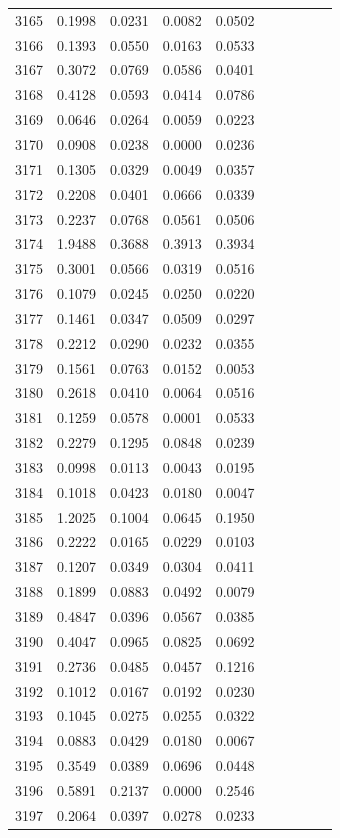 \begin{table}
\begin{tabular}{cccccccccc}
3165& 0.1998& 0.0231& 0.0082& 0.0502\\ 
3166& 0.1393& 0.0550& 0.0163& 0.0533\\ 
3167& 0.3072& 0.0769& 0.0586& 0.0401\\ 
3168& 0.4128& 0.0593& 0.0414& 0.0786\\ 
3169& 0.0646& 0.0264& 0.0059& 0.0223\\ 
3170& 0.0908& 0.0238& 0.0000& 0.0236\\ 
3171& 0.1305& 0.0329& 0.0049& 0.0357\\ 
3172& 0.2208& 0.0401& 0.0666& 0.0339\\ 
3173& 0.2237& 0.0768& 0.0561& 0.0506\\ 
3174& 1.9488& 0.3688& 0.3913& 0.3934\\ 
3175& 0.3001& 0.0566& 0.0319& 0.0516\\ 
3176& 0.1079& 0.0245& 0.0250& 0.0220\\ 
3177& 0.1461& 0.0347& 0.0509& 0.0297\\ 
3178& 0.2212& 0.0290& 0.0232& 0.0355\\ 
3179& 0.1561& 0.0763& 0.0152& 0.0053\\ 
3180& 0.2618& 0.0410& 0.0064& 0.0516\\ 
3181& 0.1259& 0.0578& 0.0001& 0.0533\\ 
3182& 0.2279& 0.1295& 0.0848& 0.0239\\ 
3183& 0.0998& 0.0113& 0.0043& 0.0195\\ 
3184& 0.1018& 0.0423& 0.0180& 0.0047\\ 
3185& 1.2025& 0.1004& 0.0645& 0.1950\\ 
3186& 0.2222& 0.0165& 0.0229& 0.0103\\ 
3187& 0.1207& 0.0349& 0.0304& 0.0411\\ 
3188& 0.1899& 0.0883& 0.0492& 0.0079\\ 
3189& 0.4847& 0.0396& 0.0567& 0.0385\\ 
3190& 0.4047& 0.0965& 0.0825& 0.0692\\ 
3191& 0.2736& 0.0485& 0.0457& 0.1216\\ 
3192& 0.1012& 0.0167& 0.0192& 0.0230\\ 
3193& 0.1045& 0.0275& 0.0255& 0.0322\\ 
3194& 0.0883& 0.0429& 0.0180& 0.0067\\ 
3195& 0.3549& 0.0389& 0.0696& 0.0448\\ 
3196& 0.5891& 0.2137& 0.0000& 0.2546\\ 
3197& 0.2064& 0.0397& 0.0278& 0.0233\\ 

\end{tabular}
\end{table}
